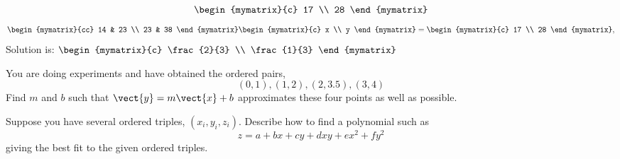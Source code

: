 \begin{ex}
\begin{sol}
\[\begin{mymatrix}{c}
17 \\
28
\end{mymatrix}
\]
\[
\begin{mymatrix}{cc}
14 & 23 \\
23 & 38
\end{mymatrix} \begin{mymatrix}{c}
x \\
y
\end{mymatrix} =\begin{mymatrix}{c}
17 \\
28
\end{mymatrix} ,
\]
Solution is: $\begin{mymatrix}{c}
\frac{2}{3} \\
\frac{1}{3}
\end{mymatrix}$
\end{sol}
\end{ex}

\begin{ex}
 You are doing experiments and have obtained the ordered pairs,
\begin{equation*}
(0,1) ,(1,2) ,(2,3.5) ,(3,4)
\end{equation*}
Find $m$ and $b$ such that $\vect{y}=m\vect{x}+b$ approximates these four points as well
as possible.
\end{ex}

\begin{ex}
Suppose you have several ordered triples, $(
x_{i},y_{i},z_{i})$. Describe how to find a polynomial such as
\begin{equation*}
z=a+bx+cy+dxy+ex^{2}+fy^{2}
\end{equation*}
 giving the best fit to the given ordered triples.
\end{ex}

